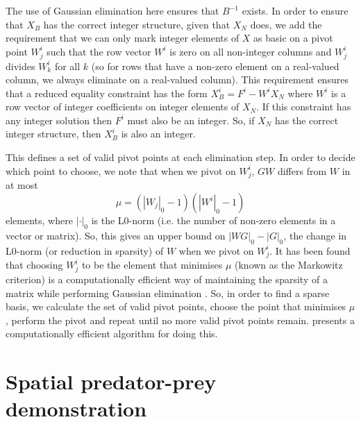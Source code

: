 \documentclass{article}
\begin{document}
The use of Gaussian elimination here ensures that $B^{-1}$ exists. In order to ensure that $X_B$ has the correct integer structure, given that $X_N$ does, we add the requirement that we can only mark integer elements of $X$ as basic on a pivot point $W^i_j$ such that the row vector $W^i$ is zero on all non-integer columns and $W^i_j$ divides $W^i_k$ for all $k$ (so for rows that have a non-zero element on a real-valued column, we always eliminate on a real-valued column). This requirement ensures that a reduced equality constraint has the form $X_B^i = F^i - W^iX_N$ where $W^i$ is a row vector of integer coefficients on integer elements of $X_N$. If this constraint has any integer solution then $F^i$ must also be an integer. So, if $X_N$ has the correct integer structure, then $X_B^i$ is also an integer.

This defines a set of valid pivot points at each elimination step. In order to decide which point to choose, we note that when we pivot on $W^i_j$, $GW$ differs from $W$ in at most 
\[
\mu = (\left|W_j\right|_0-1)(\left|W^i\right|_0-1)
\]
 elements, where $\left|\cdot\right|_0$ is the L0-norm (i.e. the number of non-zero elements in a vector or matrix). So, this gives an upper bound on $\left|WG\right|_0 - \left|G\right|_0$, the change in L0-norm (or reduction in sparsity) of $W$ when we pivot on $W^i_j$. It has been found that choosing $W^i_j$ to be the element that minimises $\mu$ (known as the Markowitz criterion) is a computationally efficient way of maintaining the sparsity of a matrix while performing Gaussian elimination \citep*{markowitz1957elimination, suhl1990computing, maros2002computational}. So, in order to find a sparse basis, we calculate the set of valid pivot points, choose the point that minimises $\mu$, perform the pivot and repeat until no more valid pivot points remain. \citet{suhl1990computing} presents a computationally efficient algorithm for doing this.

\section{Spatial predator-prey demonstration}
\end{document}
